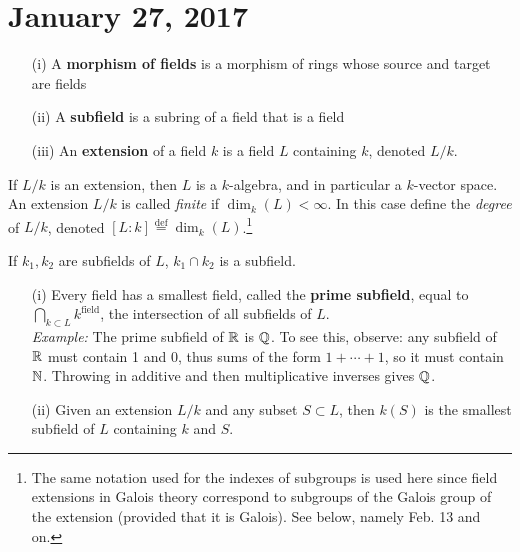 \section{January 27, 2017}

\begin{defn} \label{Defn 1, Jan 27}
\hspace{0.5cm}
\begin{enumerate}
\item[(i)] A \textbf{morphism of fields} is a morphism of rings whose source and target are fields
\item[(ii)] A \textbf{subfield} is a subring of a field that is a field
\item[(iii)] An \textbf{extension} of a field $k$ is a field $L$ containing $k$, denoted $L/k$.
\end{enumerate}
\end{defn}

\begin{rmk}
If $L/k$ is an extension, then $L$ is a $k$-algebra, and in particular a $k$-vector space. An extension $L/k$ is called \textit{finite} if $\dim_k(L) < \infty$. In this case define the \textit{degree} of $L/k$, denoted $[L : k] \stackrel{\text{def}}{=} \dim_k(L)$.\footnote{The same notation used for the indexes of subgroups is used here since field extensions in Galois theory correspond to subgroups of the Galois group of the extension (provided that it is Galois). See below, namely Feb. 13 and on.}
 \end{rmk}

\begin{fact} \label{Fact 2, Jan 27}
 If $k_1, k_2$ are subfields of $L$, $k_1 \cap k_2$ is a subfield.
\end{fact}

\begin{defn} \label{Defn 3, Jan 27}
\hspace{0.5cm}
\begin{enumerate}
\item[(i)] Every field has a smallest field, called the \textbf{prime subfield}, equal to $\bigcap_{k \subset L} k^{\text{field}}$, the intersection of all subfields of $L$. \\
\textit{Example:} The prime subfield of $\mathbb{R}$ is $\mathbb{Q}$. To see this, observe: any subfield of $\mathbb{R}$ must contain 1 and 0, thus sums of the form $1 + \cdots + 1$, so it must contain $\mathbb{N}$. Throwing in additive and then multiplicative inverses gives $\mathbb{Q}$.
\item[(ii)] Given an extension $L/k$ and any subset $S \subset L$, then $k(S)$ is the smallest subfield of $L$ containing $k$ and $S$.
\end{enumerate}
\end{defn}

